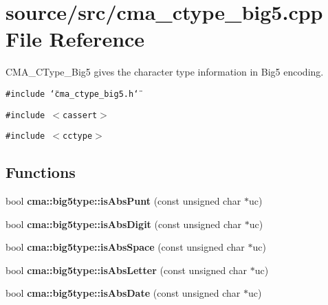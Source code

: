 \section{source/src/cma\_\-ctype\_\-big5.cpp File Reference}
\label{cma__ctype__big5_8cpp}
CMA\_\-CType\_\-Big5 gives the character type information in Big5 encoding.  


{\tt \#include \char`\"{}cma\_\-ctype\_\-big5.h\char`\"{}}\par
{\tt \#include $<$cassert$>$}\par
{\tt \#include $<$cctype$>$}\par
\subsection*{Functions}
\begin{CompactItemize}
\item 
bool {\bf cma::big5type::isAbsPunt} (const unsigned char $\ast$uc)
\item 
bool {\bf cma::big5type::isAbsDigit} (const unsigned char $\ast$uc)
\item 
bool {\bf cma::big5type::isAbsSpace} (const unsigned char $\ast$uc)
\item 
bool {\bf cma::big5type::isAbsLetter} (const unsigned char $\ast$uc)
\item 
bool {\bf cma::big5type::isAbsDate} (const unsigned char $\ast$uc)
\end{CompactItemize}
